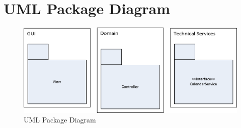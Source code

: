 \section{UML Package Diagram}
\begin{figure}[h!]
  \includegraphics[width=\textwidth,natwidth=550,natheight=220]{illustrations/UMLPackageDiagram.png}
  \caption{UML Package Diagram}
\end{figure}
\newpage
